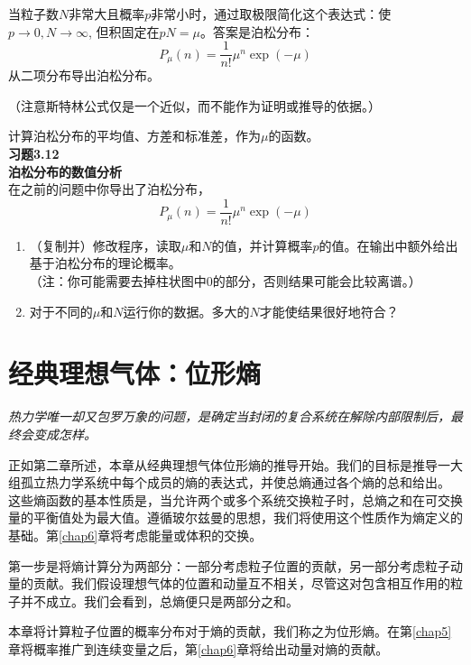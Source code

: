 \documentclass[UTF8]{ctexart}
\numberwithin{equation}{section}%
\numberwithin{figure}{section}%
\begin{document}
    当粒子数$N$非常大且概率$p$非常小时，通过取极限简化这个表达式：使$p\rightarrow 0,N\rightarrow\infty$, 但积固定在$pN=\mu$。答案是泊松分布：
    \begin{equation*}
        P_{\mu}(n)=\frac{1}{n !} \mu^{n} \exp (-\mu)
    \end{equation*}
    从二项分布导出泊松分布。

    （注意斯特林公式仅是一个近似，而不能作为证明或推导的依据。）

    计算泊松分布的平均值、方差和标准差，作为$\mu$的函数。\\
    \textbf{习题3.12}\label{prob3.12}\\
    \textbf{泊松分布的数值分析}\\

    在之前的问题中你导出了泊松分布，
    \begin{equation*}
        P_{\mu}(n)=\frac{1}{n !} \mu^{n} \exp (-\mu)
    \end{equation*}
    \begin{enumerate}
        \item （复制并）修改程序，读取$\mu$和$N$的值，并计算概率$p$的值。在输出中额外给出基于泊松分布的理论概率。
        \\（注：你可能需要去掉柱状图中0的部分，否则结果可能会比较离谱。）
        \item 对于不同的$\mu$和$N$运行你的数据。多大的$N$才能使结果很好地符合？
    \end{enumerate}
    \clearpage
    \section{经典理想气体：位形熵}\label{chap4}
    \textit{热力学唯一却又包罗万象的问题，是确定当封闭的复合系统在解除内部限制后，最终会变成怎样。
        \\}

    正如第二章所述，本章从经典理想气体位形熵的推导开始。我们的目标是推导一大组孤立热力学系统中每个成员的熵的表达式，并使总熵通过各个熵的总和给出。
    这些熵函数的基本性质是，当允许两个或多个系统交换粒子时，总熵之和在可交换量的平衡值处为最大值。遵循玻尔兹曼的思想，我们将使用这个性质作为熵定义的基础。第\ref{chap6}章将考虑能量或体积的交换。
    
    第一步是将熵计算分为两部分：一部分考虑粒子位置的贡献，另一部分考虑粒子动量的贡献。我们假设理想气体的位置和动量互不相关，尽管这对包含相互作用的粒子并不成立。我们会看到，总熵便只是两部分之和。

    本章将计算粒子位置的概率分布对于熵的贡献，我们称之为位形熵。在第\ref{chap5}章将概率推广到连续变量之后，第\ref{chap6}章将给出动量对熵的贡献。
    
\end{document}
